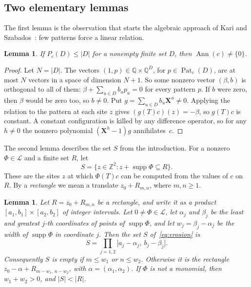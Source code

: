 \documentclass[11pt,a4paper,reqno]{amsart}
\newtheorem{lemma}[theorem]{Lemma}
\theoremstyle{definition}
\theoremstyle{remark}
\newcommand{\Z}{\mathbb Z}
\newcommand{\Q}{\mathbb Q}
\newcommand{\LL}{\mathcal L}
\newcommand{\mon}[1]{\boldsymbol X^{#1}}
\DeclareMathOperator{\Ann}{Ann}
\DeclareMathOperator{\supp}{supp}
\DeclareMathOperator{\Pat}{Pat}
\numberwithin{equation}{section}
\begin{document}
\subsection{Two elementary lemmas}
The first lemma is the observation that starts the algebraic approach of Kari and Szabados~\cite[Lemma~5]{KS}: few patterns force a linear relation.

\begin{lemma}\label{lem:ann-exists}
If $P_c(D)\le|D|$ for a nonempty finite set $D$, then $\Ann(c)\ne\{0\}$.
\end{lemma}

\begin{proof}
Let $N=|D|$. The vectors $(1,p)\in\Q\times\Q^D$, for $p\in\Pat_c(D)$, are at most $N$ vectors in a space of dimension $N+1$. So some nonzero vector $(\beta,b)$ is orthogonal to all of them: $\beta+\sum_{u\in D}b_up_u=0$ for every pattern $p$. If $b$ were zero, then $\beta$ would be zero too, so $b\ne0$. Put $g=\sum_{u\in D}b_u\mon u\ne0$. Applying the relation to the pattern at each site $z$ gives $(g(T)c)(z)=-\beta$, so $g(T)c$ is constant. A constant configuration is killed by any difference operator, so for any $h\ne0$ the nonzero polynomial $(\mon h-1)g$ annihilates~$c$.
\end{proof}

The second lemma describes the set $S$ from the introduction. For a nonzero $\Phi\in\LL$ and a finite set $R$, let
\begin{equation}\label{eq:erosion}
 S=\{z\in\Z^2: z+\supp\Phi\subseteq R\}.
\end{equation}
These are the sites $z$ at which $\Phi(T)c$ can be computed from the values of $c$ on $R$. By a \emph{rectangle} we mean a translate $z_0+R_{m,n}$, where $m,n\ge1$.

\begin{lemma}\label{lem:erosion}
Let $R=z_0+R_{m,n}$ be a rectangle, and write it as a product $[a_1,b_1]\times[a_2,b_2]$ of integer intervals. Let $0\ne\Phi\in\LL$, let $\alpha_j$ and $\beta_j$ be the least and greatest $j$-th coordinates of points of $\supp\Phi$, and let $w_j=\beta_j-\alpha_j$ be the width of $\supp\Phi$ in coordinate $j$. Then the set $S$ of~\eqref{eq:erosion} is
\[
 S=\prod_{j=1,2}\bigl[a_j-\alpha_j,\ b_j-\beta_j\bigr].
\]
Consequently $S$ is empty if $m\le w_1$ or $n\le w_2$. Otherwise it is the rectangle $z_0-\alpha+R_{m-w_1,\,n-w_2}$, with $\alpha=(\alpha_1,\alpha_2)$. If $\Phi$ is not a monomial, then $w_1+w_2>0$, and $|S|<|R|$.
\end{lemma}
\end{document}
